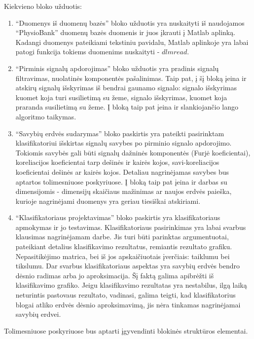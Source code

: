 \documentclass[]{vgtuef}
\begin{document}
Kiekvieno bloko užduotis:

\begin{enumerate}
\item ``Duomenys iš duomenų bazės'' bloko užduotis yra nuskaityti iš naudojamos ``PhysioBank'' duomenų bazės duomenis ir juos įkrauti į Matlab aplinką. Kadangi duomenys pateikiami tekstiniu pavidalu, Matlab aplinkoje yra labai patogi funkcija tokiems duomenims nuskaityti - $dlmread$.

\item ``Pirminis signalų apdorojimas'' bloko užduotis yra pradinis signalų filtravimas, nuolatinės komponentės pašalinimas. Taip pat, į šį bloką įeina ir atskirų signalų išskyrimas iš bendrai gaunamo signalo: signalo išskyrimas kuomet koja turi susilietimą su žeme, signalo išskyrimas, kuomet koja praranda susilietimą su žeme. Į bloką taip pat įeina ir slankiojančio lango algoritmo taikymas.
\item ``Savybių erdvės sudarymas'' bloko paskirtis yra pateikti pasirinktam klasifikatoriui išskirtas signalų savybes po pirminio signalo apdorojimo. Tokiomis savybės gali būti signalų dažninės komponentės (Furjė koeficientai), koreliacijos koeficientai tarp dešinės ir kairės kojos, savi-koreliacijos koeficientai dešinės ar kairės kojos. Detaliau nagrinėjamas savybes bus aptartos tolimesniuose poskyriuose. Į bloką taip pat įeina ir darbas su dimensijomis - dimensijų skaičiaus mažinimas ar naujos erdvės paieška, kurioje nagrinėjami duomenys yra geriau tiesiškai atskiriami.

\item ``Klasifikatoriaus projektavimas'' bloko paskirtis yra klasifikatoriaus apmokymas ir jo testavimas. Klasifikatoriaus pasirinkimas yra labai svarbus klausimas nagrinėjamam darbe. Jis turi būti parinktas argumentuotai, pateikiant detalius klasifikavimo rezultatus, remiantis rezultato grafiku. Nepasitikėjimo matrica, bei iš jos apskaičiuotais įverčiais: taiklumu bei tikslumu. Dar svarbus klasifikatoriaus aspektas yra savybių erdvės bendro dėsnio radimas arba jo aproksimacija. Šį faktą galima apibrėžti iš klasifikavimo grafiko. Jeigu klasifikavimo rezultatas yra nestabilus, ilgą laiką neturintis pastovaus rezultato, vadinasi, galima teigti, kad klasifikatorius blogai atliko erdvės dėsnio aproksimavimą, jis nėra tinkamas nagrinėjamai savybių erdvei.
\end{enumerate}

Tolimesniuose poskyriuose bus aptarti įgyvendinti blokinės struktūros elementai.
\end{document}
